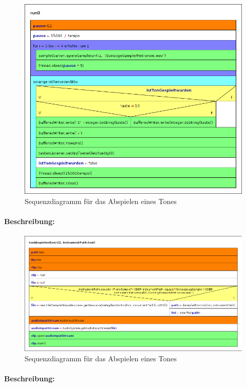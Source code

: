 \begin{figure}[h]
 \centering
 \includegraphics[width=1\textwidth]{./Bilder/Ton_Aufnehmen.png}
 \caption{Sequenzdiagramm für das Abspielen eines Tones}
\end{figure}

\paragraph{Beschreibung:} 


\newpage

\begin{figure}[h]
 \centering
 \includegraphics[width=1\textwidth]{./Bilder/tonAbspielen.png}
 \caption{Sequenzdiagramm für das Abspielen eines Tones}
\end{figure}

\paragraph{Beschreibung:} 

